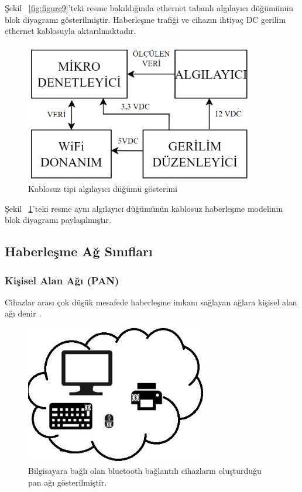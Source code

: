 Şekil ~\ref{fig:figure9}'teki resme bakıldığında ethernet tabanlı algılayıcı düğümünün blok diyagramı gösterilmiştir. Haberleşme trafiği ve cihazın ihtiyaç DC gerilim ethernet kablosuyla aktarılmaktadır.


\begin{figure}[htbp]
\centerline{\includegraphics[width=10cm]{Resim/sekil3-4.jpg}}
\caption{Kablosuz tipi algılayıcı düğümü gösterimi}
\label{fig:figure10}
\end{figure}

Şekil ~\ref{fig:figure10}'teki resme aynı algılayıcı düğümünün kablosuz haberleşme modelinin blok diyagramı paylaşılmıştır.

\subsection{Haberleşme Ağ Sınıfları}


\subsubsection{Kişisel Alan Ağı (PAN)}
Cihazlar arası çok düşük mesafede haberleşme imkanı sağlayan ağlara kişisel alan ağı denir \cite{tanenbaum2002computer}.

\begin{figure}[htbp]
\centerline{\includegraphics[width=8cm]{Resim/Sekil3-5.jpg}}
\caption{Bilgisayara bağlı olan bluetooth bağlantılı cihazların oluşturduğu \gls{pan} ağı gösterilmiştir.}
\label{fig:figure11}
\end{figure}

